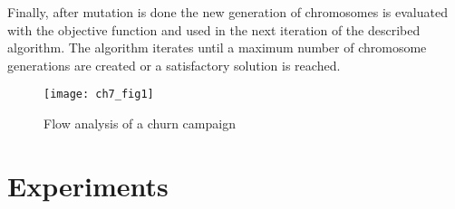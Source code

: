 Finally, after mutation is done the new generation of chromosomes is evaluated with the objective 
function and used in the next iteration of the described algorithm.
The algorithm iterates until a maximum number of chromosome generations are created or a 
satisfactory solution is reached.

	\begin{figure}[t]
	  \centering
    \texttt{[image: ch7\_fig1]}  
	  \caption{Flow analysis of a churn campaign \citep{Haupt2004}}
	  \label{fig:ch7:1}
	\end{figure}

\section{Experiments}